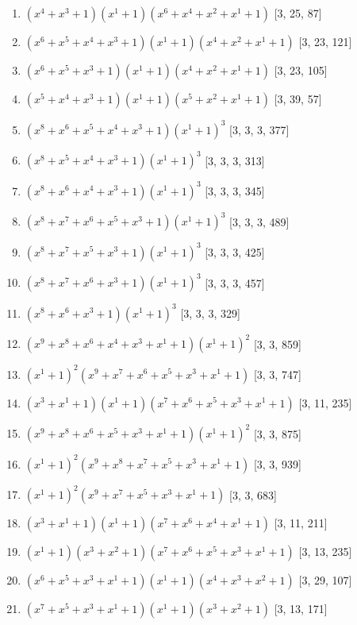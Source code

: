 \documentclass[10pt,twocolumn]{article}
\begin{document}
\begin{enumerate}
\item $(x^{4} + x^{3} + 1)(x^{1} + 1)(x^{6} + x^{4} + x^{2} + x^{1} + 1)$  [3, 25, 87]
\item $(x^{6} + x^{5} + x^{4} + x^{3} + 1)(x^{1} + 1)(x^{4} + x^{2} + x^{1} + 1)$  [3, 23, 121]
\item $(x^{6} + x^{5} + x^{3} + 1)(x^{1} + 1)(x^{4} + x^{2} + x^{1} + 1)$  [3, 23, 105]
\item $(x^{5} + x^{4} + x^{3} + 1)(x^{1} + 1)(x^{5} + x^{2} + x^{1} + 1)$  [3, 39, 57]
\item $(x^{8} + x^{6} + x^{5} + x^{4} + x^{3} + 1)(x^{1} + 1)^{3}$  [3, 3, 3, 377]
\item $(x^{8} + x^{5} + x^{4} + x^{3} + 1)(x^{1} + 1)^{3}$  [3, 3, 3, 313]
\item $(x^{8} + x^{6} + x^{4} + x^{3} + 1)(x^{1} + 1)^{3}$  [3, 3, 3, 345]
\item $(x^{8} + x^{7} + x^{6} + x^{5} + x^{3} + 1)(x^{1} + 1)^{3}$  [3, 3, 3, 489]
\item $(x^{8} + x^{7} + x^{5} + x^{3} + 1)(x^{1} + 1)^{3}$  [3, 3, 3, 425]
\item $(x^{8} + x^{7} + x^{6} + x^{3} + 1)(x^{1} + 1)^{3}$  [3, 3, 3, 457]
\item $(x^{8} + x^{6} + x^{3} + 1)(x^{1} + 1)^{3}$  [3, 3, 3, 329]
\item $(x^{9} + x^{8} + x^{6} + x^{4} + x^{3} + x^{1} + 1)(x^{1} + 1)^{2}$  [3, 3, 859]
\item $(x^{1} + 1)^{2}(x^{9} + x^{7} + x^{6} + x^{5} + x^{3} + x^{1} + 1)$  [3, 3, 747]
\item $(x^{3} + x^{1} + 1)(x^{1} + 1)(x^{7} + x^{6} + x^{5} + x^{3} + x^{1} + 1)$  [3, 11, 235]
\item $(x^{9} + x^{8} + x^{6} + x^{5} + x^{3} + x^{1} + 1)(x^{1} + 1)^{2}$  [3, 3, 875]
\item $(x^{1} + 1)^{2}(x^{9} + x^{8} + x^{7} + x^{5} + x^{3} + x^{1} + 1)$  [3, 3, 939]
\item $(x^{1} + 1)^{2}(x^{9} + x^{7} + x^{5} + x^{3} + x^{1} + 1)$  [3, 3, 683]
\item $(x^{3} + x^{1} + 1)(x^{1} + 1)(x^{7} + x^{6} + x^{4} + x^{1} + 1)$  [3, 11, 211]
\item $(x^{1} + 1)(x^{3} + x^{2} + 1)(x^{7} + x^{6} + x^{5} + x^{3} + x^{1} + 1)$  [3, 13, 235]
\item $(x^{6} + x^{5} + x^{3} + x^{1} + 1)(x^{1} + 1)(x^{4} + x^{3} + x^{2} + 1)$  [3, 29, 107]
\item $(x^{7} + x^{5} + x^{3} + x^{1} + 1)(x^{1} + 1)(x^{3} + x^{2} + 1)$  [3, 13, 171]

\end{enumerate}
\end{document}
